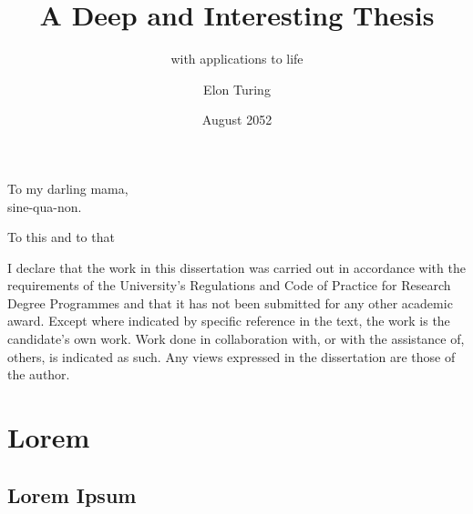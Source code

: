 \documentclass{uob-thesis}
\title{A Deep and Interesting Thesis}
\subtitle{with applications to life}
\author{Elon Turing}
\date{August 2052}
\begin{document}

\recalctypearea

\maketitle
\cleardoublepage

\begin{abstract}
  \lipsum[1-2]
\end{abstract}

\begin{dedication}
  To my darling mama,\\
  sine-qua-non.
\end{dedication}

\begin{acknowledgements}
  To this and to that
\end{acknowledgements}

\begin{declaration}
  I declare that the work in this dissertation was carried out in accordance
  with the requirements of the University's Regulations and Code of Practice for
  Research Degree Programmes and that it has not been submitted for any other
  academic award. Except where indicated by specific reference in the text, the
  work is the candidate's own work. Work done in collaboration with, or with the
  assistance of, others, is indicated as such. Any views expressed in the
  dissertation are those of the author.
\end{declaration}

\recalctypearea




\frontmatter

\tableofcontents
\listoftables
\listoffigures



\mainmatter

\part{Lorem}

\chapter{Lorem Ipsum}
\end{document}

